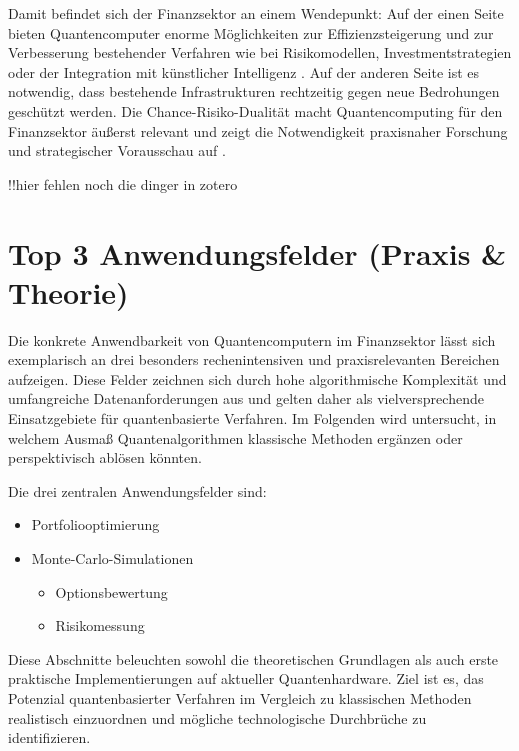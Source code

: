 Damit befindet sich der Finanzsektor an einem Wendepunkt: Auf der einen Seite bieten Quantencomputer enorme Möglichkeiten zur Effizienzsteigerung und zur Verbesserung bestehender Verfahren   wie bei Risikomodellen, Investmentstrategien oder der Integration mit künstlicher Intelligenz \cite{finance21net}. Auf der anderen Seite ist es notwendig, dass bestehende Infrastrukturen rechtzeitig gegen neue Bedrohungen geschützt werden. Die Chance-Risiko-Dualität macht Quantencomputing für den Finanzsektor äußerst relevant und zeigt die Notwendigkeit praxisnaher Forschung und strategischer Vorausschau auf \cite{springer2025,orus2019}.

!!hier fehlen noch die dinger in zotero

\section{Top 3 Anwendungsfelder (Praxis \& Theorie)}

Die konkrete Anwendbarkeit von Quantencomputern im Finanzsektor lässt sich exemplarisch an drei besonders rechenintensiven und praxisrelevanten Bereichen aufzeigen. Diese Felder zeichnen sich durch hohe algorithmische Komplexität und umfangreiche Datenanforderungen aus und gelten daher als vielversprechende Einsatzgebiete für quantenbasierte Verfahren. Im Folgenden wird untersucht, in welchem Ausmaß Quantenalgorithmen klassische Methoden ergänzen oder perspektivisch ablösen könnten.

Die drei zentralen Anwendungsfelder sind:

\begin{itemize}
    \item{Portfoliooptimierung}
   
    \item{Monte-Carlo-Simulationen}

    \begin{itemize}
        \item{Optionsbewertung}
        \item{Risikomessung}
    \end{itemize}
\end{itemize}

Diese Abschnitte beleuchten sowohl die theoretischen Grundlagen als auch erste praktische Implementierungen auf aktueller Quantenhardware. Ziel ist es, das Potenzial quantenbasierter Verfahren im Vergleich zu klassischen Methoden realistisch einzuordnen und mögliche technologische Durchbrüche zu identifizieren.

